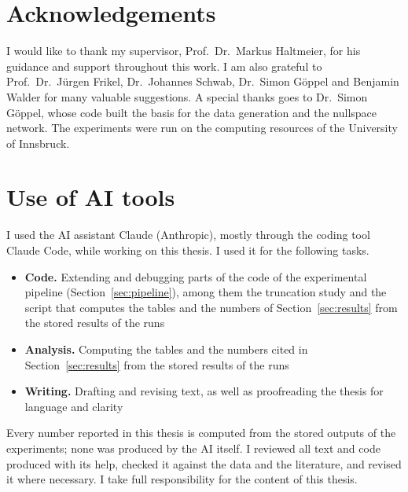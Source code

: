 \documentclass{article}
\newif\ifsectionclearpage \sectionclearpagetrue
\numberwithin{equation}{section}
\begin{document}
\section*{Acknowledgements}
I would like to thank my supervisor, Prof.\ Dr.\ Markus Haltmeier, for his guidance and support throughout
this work. I am also grateful to Prof.\ Dr.\ Jürgen Frikel, Dr.\ Johannes Schwab, Dr.\ Simon Göppel and
Benjamin Walder for many valuable suggestions. A special thanks goes to Dr.\ Simon Göppel,
whose code built the basis for the data generation and the nullspace network.
The experiments were run on the computing resources of the University of Innsbruck.

\sectionclearpagefalse
\section*{Use of AI tools}
\sectionclearpagetrue
I used the AI assistant Claude (Anthropic), mostly through the coding tool Claude Code, while working on this thesis. I used it for the following tasks.
\begin{itemize}
\item \textbf{Code.} Extending and debugging parts of the code of the experimental pipeline
(Section~\ref{sec:pipeline}), among them the truncation study and the script that computes the tables
and the numbers of Section~\ref{sec:results} from the stored results of the runs
\item \textbf{Analysis.} Computing the tables and the numbers cited in Section~\ref{sec:results} from the
stored results of the runs
\item \textbf{Writing.} Drafting and revising text, as well as proofreading the thesis for language and clarity
\end{itemize}
Every number reported in this thesis is computed from the stored outputs of the experiments; none was
produced by the AI itself. I reviewed all text and code produced with its help, checked it against the
data and the literature, and revised it where necessary. I take full responsibility for the content of
this thesis.
\printbibliography
\end{document}
